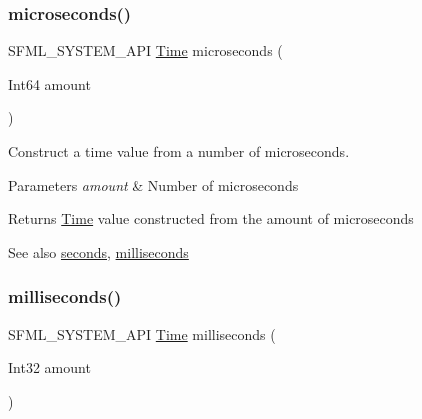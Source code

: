 \subsubsection{\texorpdfstring{microseconds()}{microseconds()}}
{\footnotesize\ttfamily S\+F\+M\+L\+\_\+\+S\+Y\+S\+T\+E\+M\+\_\+\+A\+PI \mbox{\hyperlink{classsf_1_1_time}{Time}} microseconds (\begin{DoxyParamCaption}\item[{Int64}]{amount }\end{DoxyParamCaption})\hspace{0.3cm}{\ttfamily [related]}}



Construct a time value from a number of microseconds. 


\begin{DoxyParams}{Parameters}
{\em amount} & Number of microseconds\\
\hline
\end{DoxyParams}
\begin{DoxyReturn}{Returns}
\mbox{\hyperlink{classsf_1_1_time}{Time}} value constructed from the amount of microseconds
\end{DoxyReturn}
\begin{DoxySeeAlso}{See also}
\mbox{\hyperlink{classsf_1_1_time_ae36b9ef700f0ed0516abf0194ceb546b}{seconds}}, \mbox{\hyperlink{classsf_1_1_time_ae379d420bc07170668f51522023957b9}{milliseconds}} \begin{DoxyVerb}\end{DoxyVerb}
 
\end{DoxySeeAlso}
\mbox{\label{classsf_1_1_time_ae379d420bc07170668f51522023957b9}} 
\subsubsection{\texorpdfstring{milliseconds()}{milliseconds()}}
{\footnotesize\ttfamily S\+F\+M\+L\+\_\+\+S\+Y\+S\+T\+E\+M\+\_\+\+A\+PI \mbox{\hyperlink{classsf_1_1_time}{Time}} milliseconds (\begin{DoxyParamCaption}\item[{Int32}]{amount }\end{DoxyParamCaption})\hspace{0.3cm}{\ttfamily [related]}}



